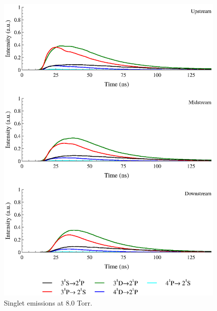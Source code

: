 \begin{figure}
  \centering
  \includegraphics{./chapters/extraem/figures/8torr_s.eps}
  \caption{Singlet emissions at 8.0 Torr.}
\end{figure}
